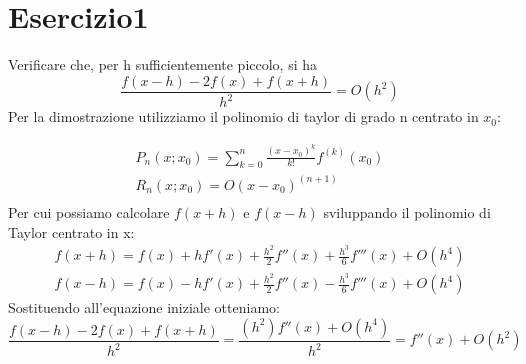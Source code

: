 \section{Esercizio1}
Verificare che, per h sufficientemente piccolo, si ha \\

\begin{equation*}
\frac{f(x-h)-2f(x)+f(x+h)}{h^2} = O(h^2)
\end{equation*}
Per la dimostrazione utilizziamo il polinomio di taylor di grado n centrato in $x_0:$

\begin{gather*}
P_n(x;x_0) = \sum_{k=0}^{n}\frac{(x-x_0)^k}{k!}f^{(k)}(x_0)\\
R_n(x;x_0) = O(x-x_0)^{(n+1)}\\
\end{gather*}
Per cui possiamo calcolare $f(x+h)$ e $f(x-h)$ sviluppando il polinomio di Taylor centrato in x: \\
\begin{gather*}
f(x+h) = f(x)+hf'(x)+\frac{h^2}{2}f''(x)+\frac{h^3}{6}f'''(x)+O(h^4)\\
f(x-h) = f(x)-hf'(x)+\frac{h^2}{2}f''(x)-\frac{h^3}{6}f'''(x)+O(h^4)
\end{gather*}
Sostituendo all'equazione iniziale otteniamo: \\
\begin{equation*}	
\frac{f(x-h)-2f(x)+f(x+h)}{h^2}  = \frac{(h^2)f''(x)+O(h^4)}{h^2}=  f''(x)+O(h^2)
\end{equation*}
